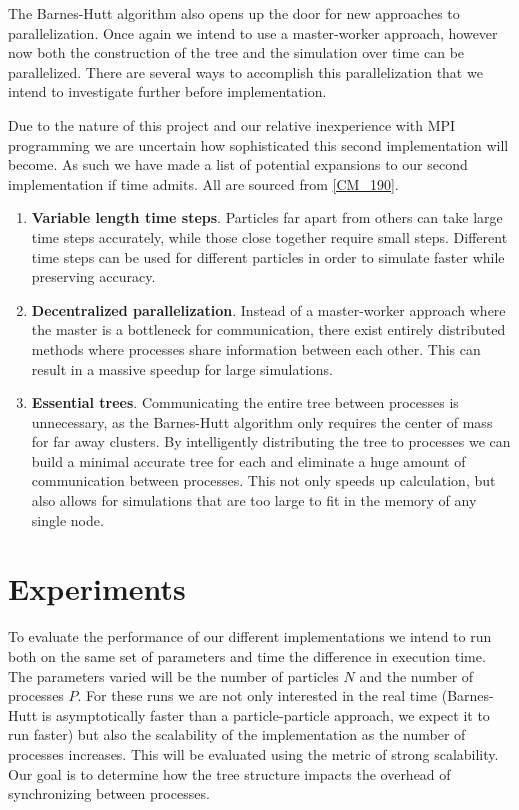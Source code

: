 \documentclass[11pt]{article}
\begin{document}
The Barnes-Hutt algorithm also opens up the door for new approaches to parallelization. Once again we intend to use a master-worker approach, however now both the construction of the tree and the simulation over time can be parallelized. There are several ways to accomplish this parallelization that we intend to investigate further before implementation.

Due to the nature of this project and our relative inexperience with MPI programming we are uncertain how sophisticated this second implementation will become. As such we have made a list of potential expansions to our second implementation if time admits. All are sourced from \ref{CM_190}.
\begin{enumerate}
    \item \textbf{Variable length time steps}. Particles far apart from others can take large time steps accurately, while those close together require small steps. Different time steps can be used for different particles in order to simulate faster while preserving accuracy.
    \item \textbf{Decentralized parallelization}. Instead of a master-worker approach where the master is a bottleneck for communication, there exist entirely distributed methods where processes share information between each other. This can result in a massive speedup for large simulations.
    \item \textbf{Essential trees}. Communicating the entire tree between processes is unnecessary, as the Barnes-Hutt algorithm only requires the center of mass for far away clusters. By intelligently distributing the tree to processes we can build a minimal accurate tree for each and eliminate a huge amount of communication between processes. This not only speeds up calculation, but also allows for simulations that are too large to fit in the memory of any single node. 
\end{enumerate}

\section {Experiments}\label{exper}
To evaluate the performance of our different implementations we intend to run both on the same set of parameters and time the difference in execution time. The parameters varied will be the number of particles $N$ and the number of processes $P$. For these runs we are not only interested in the real time (Barnes-Hutt is asymptotically faster than a particle-particle approach, we expect it to run faster) but also the scalability of the implementation as the number of processes increases. This will be evaluated using the metric of strong scalability. Our goal is to determine how the tree structure impacts the overhead of synchronizing between processes.
\end{document}
